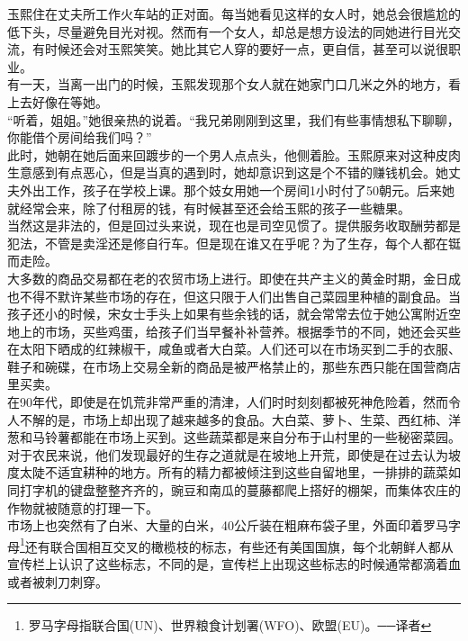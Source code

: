 玉熙住在丈夫所工作火车站的正对面。每当她看见这样的女人时，她总会很尴尬的低下头，尽量避免目光对视。然而有一个女人，却总是想方设法的同她进行目光交流，有时候还会对玉熙笑笑。她比其它人穿的要好一点，更自信，甚至可以说很职业。\\

有一天，当离一出门的时候，玉熙发现那个女人就在她家门口几米之外的地方，看上去好像在等她。\\

“听着，姐姐。”她很亲热的说着。“我兄弟刚刚到这里，我们有些事情想私下聊聊，你能借个房间给我们吗？”\\

此时，她朝在她后面来回踱步的一个男人点点头，他侧着脸。玉熙原来对这种皮肉生意感到有点恶心，但是当真的遇到时，她却意识到这是个不错的赚钱机会。她丈夫外出工作，孩子在学校上课。那个妓女用她一个房间1小时付了50朝元。后来她就经常会来，除了付租房的钱，有时候甚至还会给玉熙的孩子一些糖果。\\

当然这是非法的，但是回过头来说，现在也是司空见惯了。提供服务收取酬劳都是犯法，不管是卖淫还是修自行车。但是现在谁又在乎呢？为了生存，每个人都在铤而走险。\\

大多数的商品交易都在老的农贸市场上进行。即使在共产主义的黄金时期，金日成也不得不默许某些市场的存在，但这只限于人们出售自己菜园里种植的副食品。当孩子还小的时候，宋女士手头上如果有些余钱的话，就会常常去位于她公寓附近空地上的市场，买些鸡蛋，给孩子们当早餐补补营养。根据季节的不同，她还会买些在太阳下晒成的红辣椒干，咸鱼或者大白菜。人们还可以在市场买到二手的衣服、鞋子和碗碟，在市场上交易全新的商品是被严格禁止的，那些东西只能在国营商店里买卖。\\

在90年代，即使是在饥荒非常严重的清津，人们时时刻刻都被死神危险着，然而令人不解的是，市场上却出现了越来越多的食品。大白菜、萝卜、生菜、西红柿、洋葱和马铃薯都能在市场上买到。这些蔬菜都是来自分布于山村里的一些秘密菜园。对于农民来说，他们发现最好的生存之道就是在坡地上开荒，即使是在过去认为坡度太陡不适宜耕种的地方。所有的精力都被倾注到这些自留地里，一排排的蔬菜如同打字机的键盘整整齐齐的，豌豆和南瓜的蔓藤都爬上搭好的棚架，而集体农庄的作物就被随意的打理一下。\\

市场上也突然有了白米、大量的白米，40公斤装在粗麻布袋子里，外面印着罗马字母\footnote{罗马字母指联合国(UN)、世界粮食计划署(WFO)、欧盟(EU)。──译者}还有联合国相互交叉的橄榄枝的标志，有些还有美国国旗，每个北朝鲜人都从宣传栏上认识了这些标志，不同的是，宣传栏上出现这些标志的时候通常都滴着血或者被刺刀刺穿。\\

